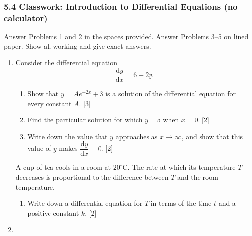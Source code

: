 \documentclass[12pt, twoside]{article}
\begin{document}
\subsubsection*{5.4 Classwork: Introduction to Differential Equations (no calculator)}

Answer Problems 1 and 2 in the spaces provided. Answer Problems 3--5 on
lined paper. Show all working and give exact answers.

\begin{enumerate}[itemsep=0.15cm]

\item[1.] [Maximum mark: 9]

Consider the differential equation
$$\frac{\mathrm{d}y}{\mathrm{d}x} = 6 - 2y.$$

\begin{enumerate}[itemsep=0.15cm]
  \item Show that $y = Ae^{-2x} + 3$ is a solution of the differential
  equation for every constant $A$. \hfill [3]
  \item Find the particular solution for which $y = 5$ when $x = 0$.
  \hfill [2]
  \item Write down the value that $y$ approaches as $x \to \infty$, and
  show that this value of $y$ makes $\dfrac{\mathrm{d}y}{\mathrm{d}x} = 0$.
  \hfill [2]
\end{enumerate}

A cup of tea cools in a room at $20^{\circ}\mathrm{C}$. The rate at which
its temperature $T$ decreases is proportional to the difference between
$T$ and the room temperature.

\begin{enumerate}[itemsep=0.15cm]
  \item[(d)] Write down a differential equation for $T$ in terms of the time
  $t$ and a positive constant $k$. \hfill [2]
\end{enumerate}


\newpage

\item[2.] [Maximum mark: 9]


\end{enumerate}
\end{document}
